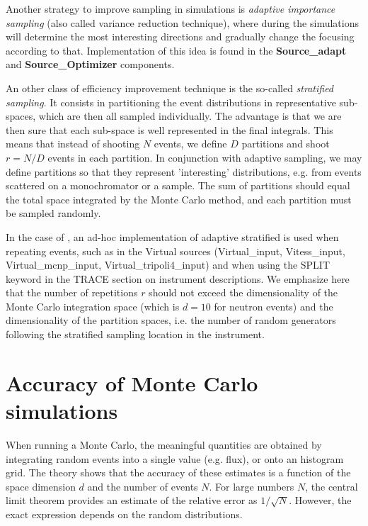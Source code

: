 Another strategy to improve sampling in simulations
is \emph{adaptive importance sampling} (also called variance reduction technique), %
where \MCS during the simulations will determine
the most interesting directions and gradually change
the focusing according to that.
Implementation of this idea is
found in the \textbf{Source\_adapt} and \textbf{Source\_Optimizer} components.

An other class of efficiency improvement technique is the so-called \emph{stratified sampling}. It consists in partitioning the event distributions in representative sub-spaces, which are then all sampled individually. The advantage is that we are then sure that each sub-space is well represented in the final integrals. This means that instead of shooting $N$ events, we define $D$ partitions and shoot $r=N/D$ events in each partition. In conjunction with adaptive sampling, we may define partitions so that they represent 'interesting' distributions, e.g. from events scattered on a monochromator or a sample. The sum of partitions should equal the total space integrated by the Monte Carlo method, and each partition must be sampled randomly.

In the case of \MCS, an ad-hoc implementation of adaptive stratified is used when repeating events, such as in the Virtual sources (Virtual\_input, Vitess\_input, Virtual\_mcnp\_input, Virtual\_tripoli4\_input) and when using the SPLIT keyword in the TRACE section on instrument descriptions. We emphasize here that the number of repetitions $r$ should not exceed the dimensionality of the Monte Carlo integration space (which is $d=10$ for neutron events) and the dimensionality of the partition spaces, i.e. the number of random generators following the stratified sampling location in the instrument.

\section{Accuracy of Monte Carlo simulations}

When running a Monte Carlo, the meaningful quantities are obtained by integrating random events into a single value (e.g. flux), or onto an histogram grid. The theory \cite{James80} shows that the accuracy of these estimates is a function of the space dimension $d$ and the number of events $N$. For large numbers $N$, the central limit theorem provides an estimate of the relative error as $1/\sqrt{N}$. However, the exact expression depends on the random distributions.

